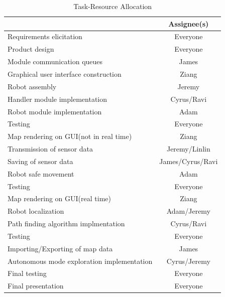 \documentclass[12pt,a4paper]{article}
\begin{document}
	\begin{table}[h!]
		\centering
		\caption{Task-Resource Allocation}
		\label{task_allocation}
		\begin{tabular}{|l|c|}
			\hline
            \rowcolor{lightgray}
			\multicolumn{1}{|c|}{\textbf{Task}}				& \textbf{Assignee(s)}	\\ \hline
			Requirements elicitation				        & Everyone				\\ \hline
			Product design									& Everyone				\\ \hline
			Module communication queues						& James					\\ \hline
			Graphical user interface construction			& Ziang					\\ \hline
			Robot assembly									& Jeremy				\\ \hline
			Handler module implementation					& Cyrus/Ravi			\\ \hline
			Robot module implementation						& Adam					\\ \hline
			Testing											& Everyone				\\ \hline
			Map rendering on GUI(not in real time)			& Ziang					\\ \hline
			Transmission of sensor data						& Jeremy/Linlin			\\ \hline
			Saving of sensor data							& James/Cyrus/Ravi		\\ \hline
			Robot safe movement								& Adam					\\ \hline
			Testing											& Everyone				\\ \hline
			Map rendering on GUI(real time)					& Ziang					\\ \hline
			Robot localization								& Adam/Jeremy					\\ \hline
			Path finding algorithm implmentation			& Cyrus/Ravi					\\ \hline
			Testing											& Everyone				\\ \hline
			Importing/Exporting of map data					& James					\\ \hline
			Autonomous mode exploration implementation		& Cyrus/Jeremy					\\ \hline
			Final testing									& Everyone				\\ \hline
			Final presentation								& Everyone				\\ \hline
		\end{tabular}
	\end{table}
    
    \newpage
	
\end{document}
